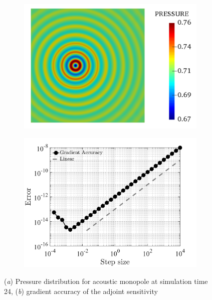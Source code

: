 \documentclass[12pt]{article}
\begin{document}
\begin{figure}[h!]
\centering
\begin{subfigure}[b]{0.44\textwidth}
\includegraphics[width=\linewidth]{fig/acoustic_pressure.png}
\caption{}
\end{subfigure}
\begin{subfigure}[b]{0.44\textwidth}
\includegraphics[width=\linewidth]{fig/gradient_error.png}
\caption{}
\label{fig:gradient_accuracy}
\end{subfigure}
\caption{(\textit{a}) Pressure distribution for acoustic monopole at simulation time 24, (\textit{b}) gradient accuracy of the adjoint sensitivity}
\label{fig:my_label}
\end{figure}
\end{document}
